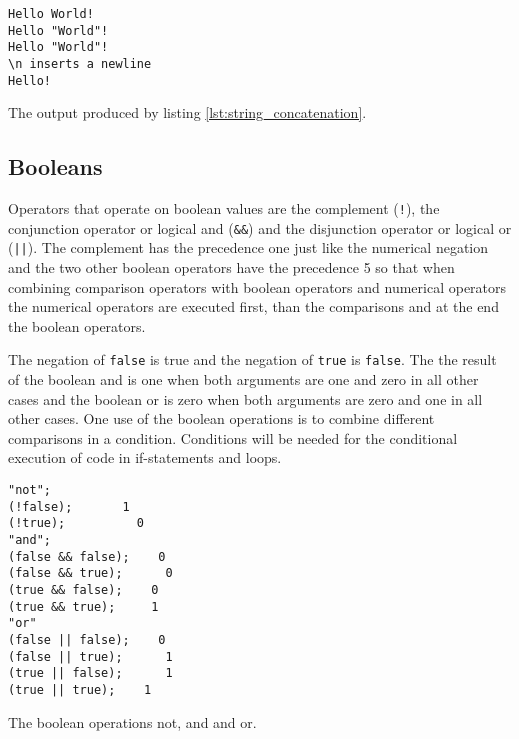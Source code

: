 \begin{listing}[H]
\begin{verbatim}
Hello World!
Hello "World"!
Hello "World"!
\n inserts a newline
Hello!
\end{verbatim}
\caption{The output produced by listing \ref{lst:string_concatenation}.}
\label{lst:string_concatenation_results}
\end{listing}

\subsection{Booleans}

Operators that operate on boolean values are the complement ({\tt !}), the conjunction operator or logical and ({\tt \&\&}) and the disjunction operator or logical or ({\tt ||}). The complement has the precedence one just like the numerical negation and the two other boolean operators have the precedence 5 so that when combining comparison operators with boolean operators and numerical operators the numerical operators are executed first, than the comparisons and at the end the boolean operators. 

The negation of {\tt false} is true and the negation of {\tt true} is  {\tt false}. The the result of the boolean and is one when both arguments are one and zero in all other cases and the boolean or is zero when both arguments are zero and one in all other cases. One use of the boolean operations is to combine different comparisons in a condition. Conditions will be needed for the conditional execution of code in if-statements and loops.

\begin{listing}[H]
\begin{verbatim}
"not";
(!false); 		1
(!true);		  0
"and";
(false && false);	 0
(false && true);	  0
(true && false);  	0
(true && true);   	1
"or"
(false || false);	 0
(false || true);	  1
(true || false);	  1
(true || true);	   1
\end{verbatim}
\caption{The boolean operations not, and and or.}
\label{lst:boolean_operations}
\end{listing}


